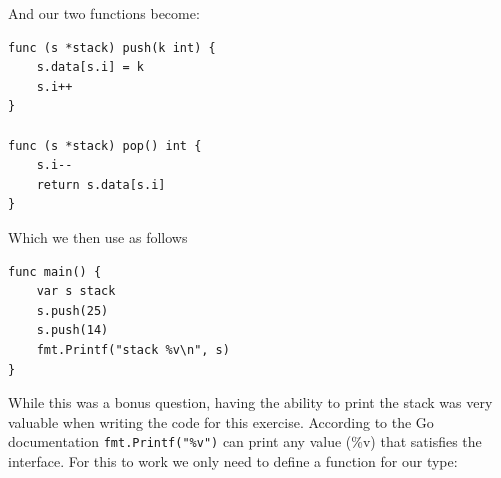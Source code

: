\begin{Answer}
\noindent{}And our two functions become:

\begin{lstlisting}[caption=The push and pop functions]
func (s *stack) push(k int) {
	s.data[s.i] = k
	s.i++
}

func (s *stack) pop() int {
	s.i--
	return s.data[s.i]
}
\end{lstlisting}

Which we then use as follows

\begin{lstlisting}[caption=Stack usage]
func main() {
	var s stack
	s.push(25)
	s.push(14)
	fmt.Printf("stack %v\n", s)
}
\end{lstlisting}

\Question While this was a bonus question, having the ability to print
the stack was very valuable when writing the code for this exercise.
According to the Go documentation \lstinline{fmt.Printf("%v")} can
print any value (\%v) that satisfies the  interface.
For this to work we only need to define a  function for
our type:

\end{Answer}
